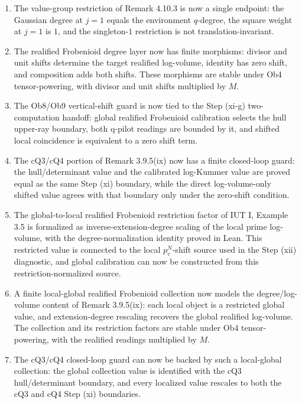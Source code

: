 \documentclass[11pt]{article}
\newcommand{\IUT}{IUT}
\newcommand{\Lean}{Lean}
\theoremstyle{plain}
\theoremstyle{definition}
\theoremstyle{remark}
\begin{document}
\begin{enumerate}
  \Lean{} proves successor-step constancy and invariance under arbitrary
  permutations of the spoke labels.
\item The value-group restriction of Remark 4.10.3 is now a single endpoint:
  the Gaussian degree at \(j=1\) equals the environment \(q\)-degree, the
  square weight at \(j=1\) is \(1\), and the singleton-\(1\) restriction is
  not translation-invariant.
\item The realified Frobenioid degree layer now has finite morphisms: divisor
  and unit shifts determine the target realified log-volume, identity has zero
  shift, and composition adds both shifts.  These morphisms are stable under
  Ob4 tensor-powering, with divisor and unit shifts multiplied by \(M\).
\item The Ob8/Ob9 vertical-shift guard is now tied to the Step (xi-g)
  two-computation handoff: global realified Frobenioid calibration selects the
  hull upper-ray boundary, both q-pilot readings are bounded by it, and shifted
  local coincidence is equivalent to a zero shift term.
\item The cQ3/cQ4 portion of Remark 3.9.5(ix) now has a finite closed-loop
  guard: the hull/determinant value and the calibrated log-Kummer value are
  proved equal as the same Step (xi) boundary, while the direct log-volume-only
  shifted value agrees with that boundary only under the zero-shift condition.
\item The global-to-local realified Frobenioid restriction factor of \IUT{} I,
  Example 3.5 is formalized as inverse-extension-degree scaling of the local
  prime log-volume, with the degree-normalization identity proved in \Lean{}.
  This restricted value is connected to the local \(p_v^N\)-shift source used
  in the Step (xii) diagnostic, and global calibration can now be constructed
  from this restriction-normalized source.
\item A finite local-global realified Frobenioid collection now models the
  degree/log-volume content of Remark 3.9.5(ix): each local object is a
  restricted global value, and extension-degree rescaling recovers the global
  realified log-volume.  The collection and its restriction factors are stable
  under Ob4 tensor-powering, with the realified readings multiplied by \(M\).
\item The cQ3/cQ4 closed-loop guard can now be backed by such a local-global
  collection: the global collection value is identified with the cQ3
  hull/determinant boundary, and every localized value rescales to both the
  cQ3 and cQ4 Step (xi) boundaries.

\end{enumerate}
\end{document}
